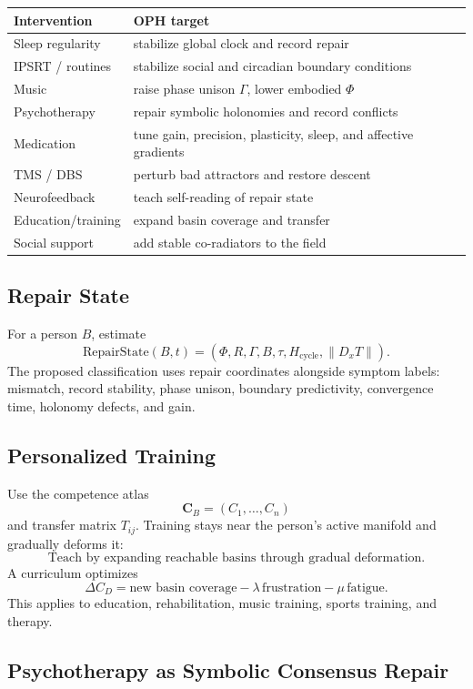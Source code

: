 \documentclass[11pt]{article}
\theoremstyle{remark}
\theoremstyle{plain}
\begin{document}
\begin{longtable}{L{0.26\textwidth}L{0.64\textwidth}}
\toprule
\textbf{Intervention} & \textbf{OPH target} \\
\midrule
\endhead
Sleep regularity & stabilize global clock and record repair \\
IPSRT / routines & stabilize social and circadian boundary conditions \\
Music & raise phase unison \(\Gamma\), lower embodied \(\Phi\) \\
Psychotherapy & repair symbolic holonomies and record conflicts \\
Medication & tune gain, precision, plasticity, sleep, and affective gradients \\
TMS / DBS & perturb bad attractors and restore descent \\
Neurofeedback & teach self-reading of repair state \\
Education/training & expand basin coverage and transfer \\
Social support & add stable co-radiators to the field \\
\bottomrule
\end{longtable}

\subsection{Repair State}

For a person \(B\), estimate
\[
\boxed{
\mathrm{RepairState}(B,t)
=
(\Phi,R,\Gamma,B,\tau,H_{\mathrm{cycle}},\|D_xT\|).
}
\]
The proposed classification uses repair coordinates alongside symptom labels:
mismatch, record stability, phase unison, boundary predictivity, convergence
time, holonomy defects, and gain.

\subsection{Personalized Training}

Use the competence atlas
\[
\mathbf C_B=(C_1,\ldots,C_n)
\]
and transfer matrix \(T_{ij}\). Training stays near the person's active manifold and gradually deforms it:
\[
\boxed{
\text{Teach by expanding reachable basins through gradual deformation.}
}
\]
A curriculum optimizes
\[
\Delta C_D
=
\text{new basin coverage}
-
\lambda\,\text{frustration}
-
\mu\,\text{fatigue}.
\]
This applies to education, rehabilitation, music training, sports training, and therapy.

\subsection{Psychotherapy as Symbolic Consensus Repair}
\end{document}
